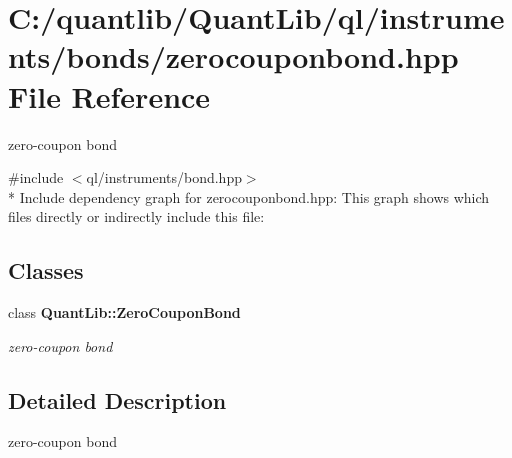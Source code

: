 \section{C\+:/quantlib/\+Quant\+Lib/ql/instruments/bonds/zerocouponbond.hpp File Reference}
\label{zerocouponbond_8hpp}


zero-\/coupon bond  


{\ttfamily \#include $<$ql/instruments/bond.\+hpp$>$}\\*
Include dependency graph for zerocouponbond.\+hpp\+:
This graph shows which files directly or indirectly include this file\+:
\subsection*{Classes}
\begin{DoxyCompactItemize}
\item 
class {\bf Quant\+Lib\+::\+Zero\+Coupon\+Bond}
\begin{DoxyCompactList}\small\item\em zero-\/coupon bond \end{DoxyCompactList}\end{DoxyCompactItemize}


\subsection{Detailed Description}
zero-\/coupon bond 

